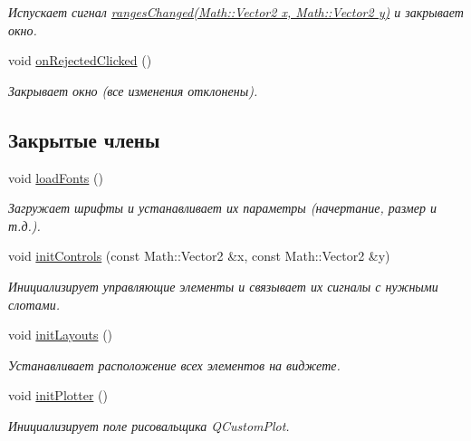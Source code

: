 \begin{DoxyCompactItemize}
\begin{DoxyCompactList}\small\item\em Испускает сигнал \hyperlink{class_ranges_dialog_a8d4fb1f4d8bd2e5e3d0bc36f390e4974}{ranges\+Changed(\+Math\+::\+Vector2 x, Math\+::\+Vector2 y)} и закрывает окно. \end{DoxyCompactList}\item 
void \hyperlink{class_ranges_dialog_a468a5018e8cce506affa2113b1e620e3}{on\+Rejected\+Clicked} ()\hypertarget{class_ranges_dialog_a468a5018e8cce506affa2113b1e620e3}{}\label{class_ranges_dialog_a468a5018e8cce506affa2113b1e620e3}

\begin{DoxyCompactList}\small\item\em Закрывает окно (все изменения отклонены). \end{DoxyCompactList}\end{DoxyCompactItemize}
\subsection*{Закрытые члены}
\begin{DoxyCompactItemize}
\item 
void \hyperlink{class_ranges_dialog_ad57f53fe1a4c87c825f02154b539c10c}{load\+Fonts} ()
\begin{DoxyCompactList}\small\item\em Загружает шрифты и устанавливает их параметры (начертание, размер и т.\+д.). \end{DoxyCompactList}\item 
void \hyperlink{class_ranges_dialog_aa05dcc5245ec5014e71866acdfc81de1}{init\+Controls} (const Math\+::\+Vector2 \&x, const Math\+::\+Vector2 \&y)
\begin{DoxyCompactList}\small\item\em Инициализирует управляющие элементы и связывает их сигналы с нужными слотами. \end{DoxyCompactList}\item 
void \hyperlink{class_ranges_dialog_abd72fb84fe9762c5b3a53811fc3dde91}{init\+Layouts} ()\hypertarget{class_ranges_dialog_abd72fb84fe9762c5b3a53811fc3dde91}{}\label{class_ranges_dialog_abd72fb84fe9762c5b3a53811fc3dde91}

\begin{DoxyCompactList}\small\item\em Устанавливает расположение всех элементов на виджете. \end{DoxyCompactList}\item 
void \hyperlink{class_ranges_dialog_a12f1da38b72c0a1005145f56e9160ba6}{init\+Plotter} ()\hypertarget{class_ranges_dialog_a12f1da38b72c0a1005145f56e9160ba6}{}\label{class_ranges_dialog_a12f1da38b72c0a1005145f56e9160ba6}

\begin{DoxyCompactList}\small\item\em Инициализирует поле рисовальщика Q\+Custom\+Plot. \end{DoxyCompactList}\end{DoxyCompactItemize}
